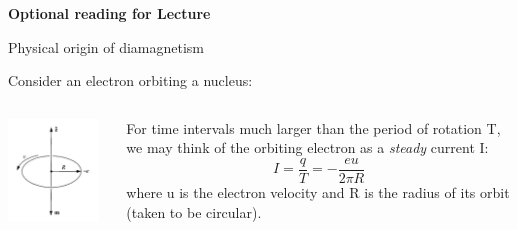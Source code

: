 

\begin{frame}[plain,c]
\begin{center}
{\Huge \bf Optional reading for Lecture \thislecture}
\end{center}
\end{frame}


%
%
%

\begin{frame}{Physical origin of diamagnetism}

Consider an electron orbiting a nucleus:\\
\vspace{0.3cm}

\begin{columns}
  \begin{column}{0.35\textwidth}
    \begin{center}
      \includegraphics[width=0.94\textwidth]{./images/schematics/orbiting_electron_magnetic_dipole_moment.png}\\
    \end{center}
  \end{column}
  \begin{column}{0.65\textwidth}
     For time intervals much larger than the period of rotation T,
     we may think of the orbiting electron as a {\em steady} current I:
     \begin{equation*}
        I = \frac{q}{T} = - \frac{eu}{2\pi R}
     \end{equation*}
     where u is the electron velocity and R is the radius of its orbit (taken to be circular).
  \end{column}
\end{columns}


\end{frame}
